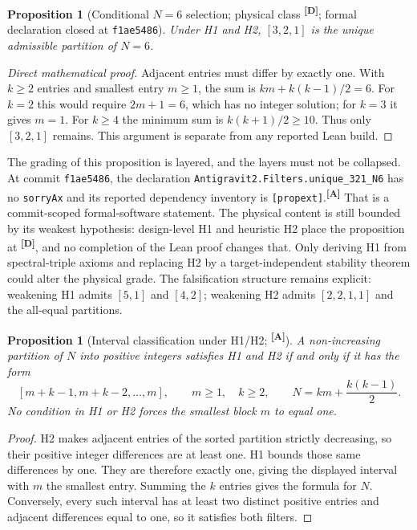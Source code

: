 \documentclass[12pt,a4paper,twoside]{article}
\theoremstyle{plain}
\newtheorem{proposition}[theorem]{Proposition}
\theoremstyle{definition}
\theoremstyle{remark}
\newcommand{\catmark}[1]{\textsuperscript{\textsf{\textbf{[#1]}}}}
\begin{document}
\begin{proposition}[Conditional $N=6$ selection; physical class \catmark{D}; formal declaration closed at \texttt{f1ae5486}]
\label{prop:unique321}
Under H1 and H2, $[3,2,1]$ is the unique admissible partition of $N=6$.
\end{proposition}
\begin{proof}[Direct mathematical proof]
Adjacent entries must differ by exactly one. With $k\geq2$ entries and
smallest entry $m\geq1$, the sum is $km+k(k-1)/2=6$. For $k=2$ this would
require $2m+1=6$, which has no integer solution; for $k=3$ it gives $m=1$.
For $k\geq4$ the minimum sum is $k(k+1)/2\geq10$. Thus only $[3,2,1]$
remains. This argument is separate from any reported Lean build.
\end{proof}

The grading of this proposition is layered, and the layers must not be
collapsed. At commit \texttt{f1ae5486}, the declaration
\texttt{Antigravit2.Filters.unique\_321\_N6} has no \texttt{sorryAx} and
its reported dependency inventory is \texttt{[propext]}.\catmark{A}
That is a commit-scoped formal-software statement. The physical content is
still bounded by its weakest hypothesis: design-level H1 and heuristic H2
place the proposition at \catmark{D}, and no completion of the Lean proof
changes that. Only deriving H1 from spectral-triple axioms and replacing H2
by a target-independent stability theorem could alter the physical grade.
The falsification structure remains explicit: weakening H1 admits $[5,1]$
and $[4,2]$; weakening H2 admits $[2,2,1,1]$ and the all-equal partitions.

\begin{proposition}[Interval classification under H1/H2; \catmark{A}]
\label{prop:interval-classification}
\label{oq:staircase} %
A non-increasing partition of $N$ into positive integers satisfies H1 and H2
if and only if it has the form
\[
 [m+k-1,m+k-2,\ldots,m],\qquad m\geq1,\quad k\geq2,
 \qquad N=km+\frac{k(k-1)}{2}.
\]
No condition in H1 or H2 forces the smallest block $m$ to equal one.
\end{proposition}
\begin{proof}
H2 makes adjacent entries of the sorted partition strictly decreasing, so
their positive integer differences are at least one. H1 bounds those same
differences by one. They are therefore exactly one, giving the displayed
interval with $m$ the smallest entry. Summing the $k$ entries gives the
formula for $N$. Conversely, every such interval has at least two distinct
positive entries and adjacent differences equal to one, so it satisfies
both filters.
\end{proof}
\end{document}
